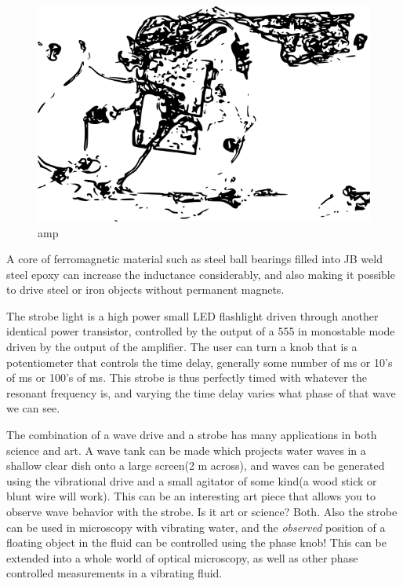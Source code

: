 \begin{figure}[htbp]
\centering
\includegraphics{images/ampimage.png}
\caption{amp}
\end{figure}

A core of ferromagnetic material such as steel ball bearings filled into
JB weld steel epoxy can increase the inductance considerably, and also
making it possible to drive steel or iron objects without permanent
magnets.

The strobe light is a high power small LED flashlight driven through
another identical power transistor, controlled by the output of a 555 in
monostable mode driven by the output of the amplifier. The user can turn
a knob that is a potentiometer that controls the time delay, generally
some number of ms or 10's of ms or 100's of ms. This strobe is thus
perfectly timed with whatever the resonant frequency is, and varying the
time delay varies what phase of that wave we can see.

The combination of a wave drive and a strobe has many applications in
both science and art. A wave tank can be made which projects water waves
in a shallow clear dish onto a large screen(2 m across), and waves can
be generated using the vibrational drive and a small agitator of some
kind(a wood stick or blunt wire will work). This can be an interesting
art piece that allows you to observe wave behavior with the strobe. Is
it art or science? Both. Also the strobe can be used in microscopy with
vibrating water, and the \emph{observed} position of a floating object
in the fluid can be controlled using the phase knob! This can be
extended into a whole world of optical microscopy, as well as other
phase controlled measurements in a vibrating fluid.

